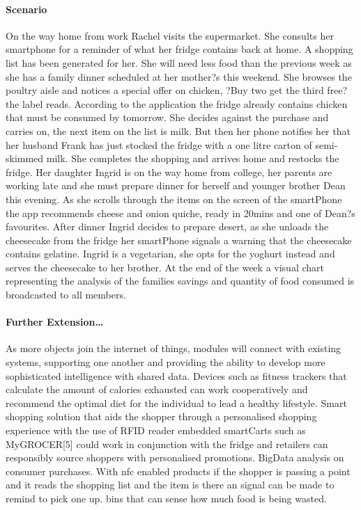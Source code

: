\documentclass[a4paper, 11pt]{article}
\begin{document}
\paragraph{Scenario}On the way home from work Rachel visits the supermarket. She consults her smartphone for a reminder of what her fridge contains back at home. A shopping list has been generated for her. She will need less food than the previous week as she has a family dinner scheduled at her mother?s this weekend. She browses the poultry aisle and notices a special offer on chicken, ?Buy two get the third free? the label reads. According to the application the fridge already contains chicken that must be consumed by tomorrow. She decides against the purchase and carries on, the next item on the list is milk. But then her phone notifies her that her husband Frank has just stocked the fridge with a one litre carton of semi-skimmed milk. She completes the shopping and arrives home and restocks the fridge. Her daughter Ingrid is on the way home from college, her parents are working late and she must prepare dinner for herself and younger brother Dean this evening. As she scrolls through the items on the screen of the smartPhone the app recommends cheese and onion quiche, ready in 20mins and one of Dean?s favourites. After dinner Ingrid decides to prepare desert, as she unloads the cheesecake from the fridge her smartPhone signals a warning that the cheesecake contains gelatine. Ingrid is a vegetarian, she opts for the yoghurt instead and serves the cheesecake to her brother. At the end of the week a visual chart representing the analysis of the families savings and quantity of food consumed is broadcasted to all members.

\paragraph{Further Extension\dots} As more objects join the internet of things, modules will connect with existing systems, supporting one another and providing the ability to develop more sophisticated intelligence with shared data. Devices such as fitness trackers that calculate the amount of calories exhausted can work cooperatively and recommend the optimal diet for the individual to lead a healthy lifestyle. Smart shopping solution that aids the shopper through a personalised shopping experience with the use of RFID reader embedded smartCarts such as MyGROCER[5] could work in conjunction with the fridge and retailers can responsibly source shoppers with personalised promotions. BigData analysis on consumer purchases. With nfc enabled products if the shopper is passing a point and it reads the shopping list and the item is there an signal can be made to remind to pick one up. bins that can sense how much food is being wasted.
\end{document}
